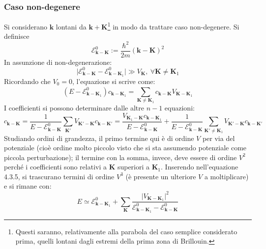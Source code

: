 \documentclass[10pt, a4paper]{scrartcl}
\numberwithin{equation}{subsection}
\theoremstyle{style1}
\begin{document}
\subsubsection{Caso non-degenere}
Si considerano $\mathbf{k} $ lontani da $\mathbf{k} + \mathbf{K} $\footnote{Questi saranno, relativamente alla parabola del caso semplice considerato prima, quelli lontani dagli estremi della prima zona di Brillouin.} in modo da trattare caso non-degenere. Si definisce 
\begin{equation}
	\mathscr{E}^0_{\mathbf{k} -\mathbf{K} } := \frac{\hbar ^2}{2m}(\mathbf{k} -\mathbf{K} )^2
\end{equation}
In assunzione di non-degenerazione:
\[
\lvert \mathscr{E}^0_{\mathbf{k} -\mathbf{K} } - \mathscr{E}^0_{\mathbf{k} -\mathbf{K} _1}  \rvert \gg V_\mathbf{K} , \ \forall \mathbf{K} \neq \mathbf{K} _1
\] 
Ricordando che $V_0=0$, l'equazione si scrive come:
\begin{equation}
	(E-\mathscr{E}^0_{\mathbf{k}-\mathbf{K} _1 }) c_{\mathbf{k} -\mathbf{K} _1} = \sum_{\mathbf{K} \neq\mathbf{K}_1 }^{} c_{\mathbf{k} -\mathbf{K} } V_{\mathbf{K} -\mathbf{K} _1} 
\end{equation}
I coefficienti si possono determinare dalle altre $n-1$ equazioni:
\begin{equation}
	c_{\mathbf{k} -\mathbf{K} } = \frac{1}{E - \mathscr{E}^0_{\mathbf{k} - \mathbf{K} } } \sum_{\mathbf{K} '}^{} V_{\mathbf{K}' - \mathbf{K} } c_{\mathbf{k} - \mathbf{K} '}=\frac{V_{\mathbf{K} _1 - \mathbf{K} } c_{\mathbf{k} -\mathbf{K} _1} }{E-\mathscr{E}^0_{\mathbf{k} -\mathbf{K} } } + \frac{1}{E-\mathscr{E}^0_{\mathbf{k} -\mathbf{K} } } \sum_{\mathbf{K} ' \neq \mathbf{K} _1}^{} V_{\mathbf{K} '-\mathbf{K} }c_{\mathbf{k} -\mathbf{K} '} 
	\end{equation}
Studiando ordini di grandezza, il primo termine qui \`e di ordine $V$ per via del potenziale (cio\`e ordine molto piccolo visto che si sta assumendo potenziale come piccola perturbazione); il termine con la somma, invece, deve essere di ordine $V^2$ perch\'e i coefficienti sono relativi a $\mathbf{K} $ superiori a $\mathbf{K} _1$. Inserendo nell'equazione 4.3.5, si trascurano termini di ordine $V^3$ (\`e presente un ulteriore $V$ a moltiplicare) e si rimane con:
\begin{equation}
	E \simeq \mathscr{E}^0_{\mathbf{k} -\mathbf{K} _1}  + \sum_{\mathbf{K} }^{} \frac{\lvert V_{\mathbf{K}-\mathbf{K} _1 }   \rvert ^2}{\mathscr{E}^0_{\mathbf{k} -\mathbf{K} _1 } - \mathscr{E}^0 _{\mathbf{k} -\mathbf{K} } }
\end{equation}
\end{document}
